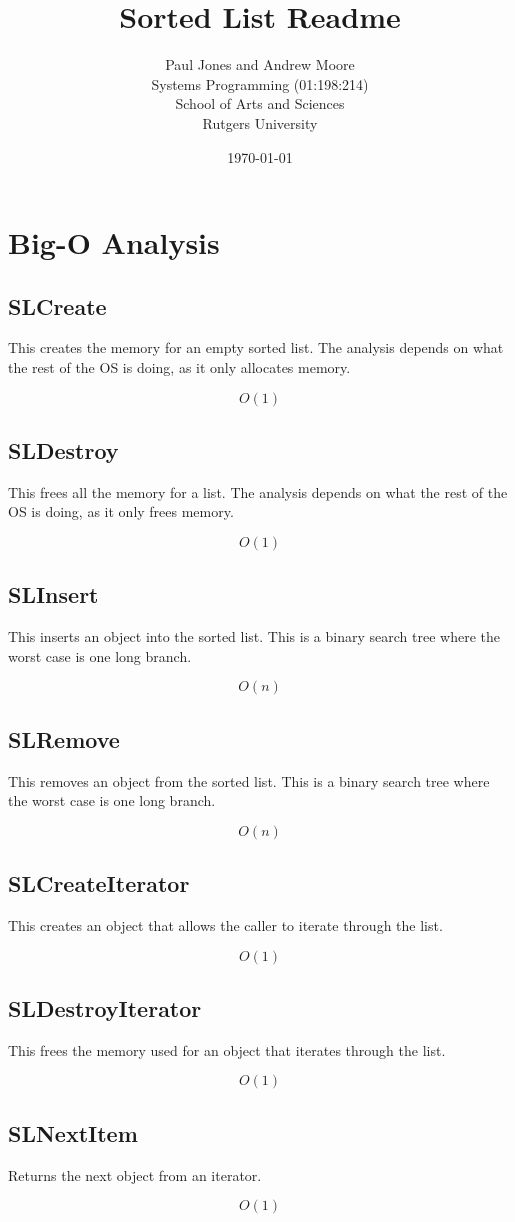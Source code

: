 \documentclass{article}
\title{Sorted List Readme}
\date{\today}
\author{Paul Jones and Andrew Moore \\ Systems Programming (01:198:214) \\ School of Arts and Sciences \\ Rutgers University}
\begin{document}
\maketitle

\clearpage

\section*{Big-O Analysis}

\subsection*{SLCreate}

This creates the memory for an empty sorted list. The analysis depends on what the
rest of the OS is doing, as it only allocates memory. 

$$O(1)$$

\subsection*{SLDestroy}

This frees all the memory for a list. The analysis depends on what the
rest of the OS is doing, as it only frees memory. 

$$O(1)$$

\subsection*{SLInsert}

This inserts an object into the sorted list.
This is a binary search tree where the worst case is one long branch.

$$O(n)$$

\subsection*{SLRemove}

This removes an object from the sorted list.
This is a binary search tree where the worst case is one long branch.

$$O(n)$$

\subsection*{SLCreateIterator}

This creates an object that allows the caller to iterate through the list.

$$O(1)$$

\subsection*{SLDestroyIterator}

This frees the memory used for an object that iterates through the list.

$$O(1)$$

\subsection*{SLNextItem}

Returns the next object from an iterator.

$$O(1)$$
\end{document}
